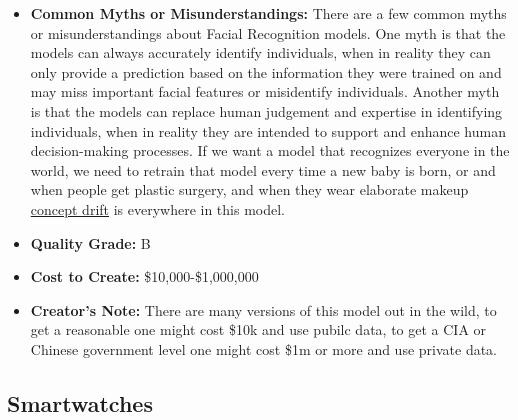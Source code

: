 \begin{itemize}
\begin{itemize}
    \item \textbf{Common Myths or Misunderstandings:} There are a few common myths or misunderstandings about Facial Recognition models. One myth is that the models can always accurately identify individuals, when in reality they can only provide a prediction based on the information they were trained on and may miss important facial features or misidentify individuals. Another myth is that the models can replace human judgement and expertise in identifying individuals, when in reality they are intended to support and enhance human decision-making processes. If we want a model that recognizes everyone in the world, we need to retrain that model every time a new baby is born, or and when people get plastic surgery, and when they wear elaborate makeup \hyperref[sec:drift]{concept drift} is everywhere in this model.  
    \item \textbf{Quality Grade:} B
    \item \textbf{Cost to Create:} \$10,000-\$1,000,000
    \item \textbf{Creator's Note:} There are many versions of this model out in the wild, to get a reasonable one might cost \$10k and use pubilc data, to get a CIA or Chinese government level one might cost \$1m or more and use private data. 
\end{itemize}

\subsection{Smartwatches} 


\end{itemize}
